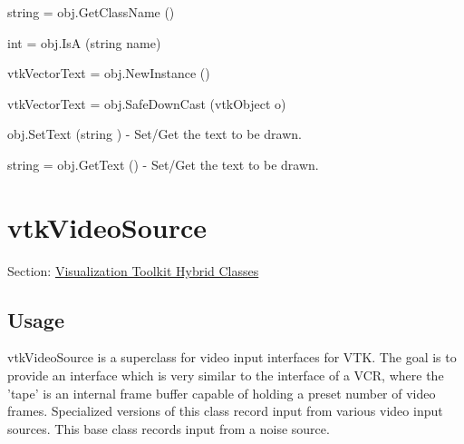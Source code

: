 \begin{DoxyItemize}
\item {\ttfamily string = obj.\-Get\-Class\-Name ()}  
\item {\ttfamily int = obj.\-Is\-A (string name)}  
\item {\ttfamily vtk\-Vector\-Text = obj.\-New\-Instance ()}  
\item {\ttfamily vtk\-Vector\-Text = obj.\-Safe\-Down\-Cast (vtk\-Object o)}  
\item {\ttfamily obj.\-Set\-Text (string )} -\/ Set/\-Get the text to be drawn.  
\item {\ttfamily string = obj.\-Get\-Text ()} -\/ Set/\-Get the text to be drawn.  
\end{DoxyItemize}\hypertarget{vtkhybrid_vtkvideosource}{}\section{vtk\-Video\-Source}\label{vtkhybrid_vtkvideosource}
Section\-: \hyperlink{sec_vtkhybrid}{Visualization Toolkit Hybrid Classes} \hypertarget{vtkwidgets_vtkxyplotwidget_Usage}{}\subsection{Usage}\label{vtkwidgets_vtkxyplotwidget_Usage}
vtk\-Video\-Source is a superclass for video input interfaces for V\-T\-K. The goal is to provide an interface which is very similar to the interface of a V\-C\-R, where the 'tape' is an internal frame buffer capable of holding a preset number of video frames. Specialized versions of this class record input from various video input sources. This base class records input from a noise source.

